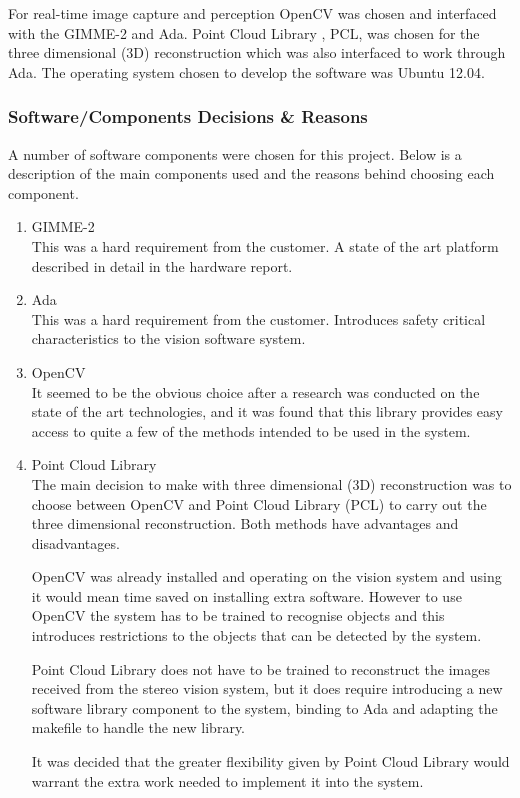For real-time image capture and perception OpenCV \cite{web:OpenCV} was chosen and interfaced with the GIMME-2 and Ada. Point Cloud Library \cite{web:PCL}, PCL, was chosen for the three dimensional (3D) reconstruction which was also interfaced to work through Ada. The operating system chosen to develop the software was Ubuntu 12.04.

\subsubsection{Software/Components Decisions \& Reasons}
A number of software components were chosen for this project. Below is a description of the main components used and the reasons behind choosing each component. 
\begin{enumerate}
  \item GIMME-2 \\ This was a hard requirement from the customer. A state of the art platform described in detail in the hardware report.
  \item Ada \\ This was a hard requirement from the customer. Introduces safety critical characteristics to the vision software system.
  \item OpenCV \\ It seemed to be the obvious choice after a research was conducted on the state of the art technologies, and it was found that this library provides easy access to quite a few of the methods intended to be used in the system.
  \item Point Cloud Library \\ The main decision to make with three dimensional (3D) reconstruction was to choose between OpenCV and Point Cloud Library (PCL) to carry out the three dimensional reconstruction. Both methods have advantages and disadvantages.

OpenCV was already installed and operating on the vision system and using it would mean time saved on installing extra software. However to use OpenCV the system has to be trained to recognise objects and this introduces restrictions to the objects that can be detected by the system.

Point Cloud Library does not have to be trained to reconstruct the images received from the stereo vision system, but it does require introducing a new software library component to the system, binding to Ada and adapting the makefile to handle the new library.

It was decided that the greater flexibility given by Point Cloud Library would warrant the extra work needed to implement it into the system.
\end{enumerate}

